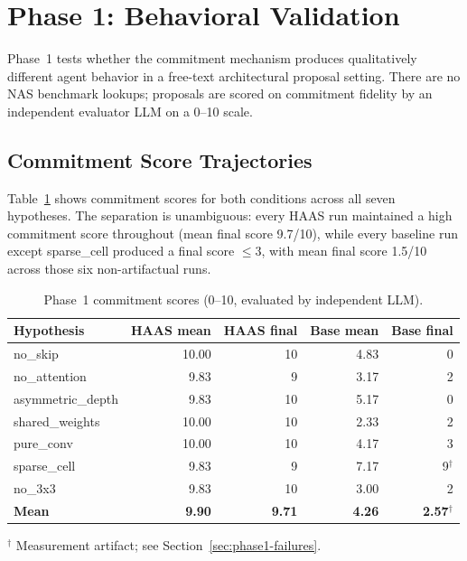 \documentclass[10pt]{article}
\newcommand{\haas}{\textsc{HAAS}}
\begin{document}
\section{Phase 1: Behavioral Validation}
\label{sec:phase1}

Phase~1 tests whether the commitment mechanism produces qualitatively different
agent behavior in a free-text architectural proposal setting. There are no NAS
benchmark lookups; proposals are scored on commitment fidelity by an independent
evaluator LLM on a 0--10 scale.

\subsection{Commitment Score Trajectories}
\label{sec:phase1-scores}

Table~\ref{tab:phase1} shows commitment scores for both conditions across all
seven hypotheses. The separation is unambiguous: every \haas{} run maintained a
high commitment score throughout (mean final score 9.7/10), while every baseline
run except sparse\_cell produced a final score $\leq 3$, with mean final score
1.5/10 across those six non-artifactual runs.

\begin{table}[t]
\caption{Phase~1 commitment scores (0--10, evaluated by independent LLM).}
\label{tab:phase1}
\begin{center}
\small
\begin{tabular}{lrrrr}
\toprule
\textbf{Hypothesis} & \textbf{HAAS mean} & \textbf{HAAS final} &
                      \textbf{Base mean} & \textbf{Base final} \\
\midrule
no\_skip          & 10.00 & 10 & 4.83 &  0 \\
no\_attention     &  9.83 &  9 & 3.17 &  2 \\
asymmetric\_depth &  9.83 & 10 & 5.17 &  0 \\
shared\_weights   & 10.00 & 10 & 2.33 &  2 \\
pure\_conv        & 10.00 & 10 & 4.17 &  3 \\
sparse\_cell      &  9.83 &  9 & 7.17 &  9$^\dagger$ \\
no\_3x3           &  9.83 & 10 & 3.00 &  2 \\
\midrule
\textbf{Mean}     &  \textbf{9.90} & \textbf{9.71} & \textbf{4.26} & \textbf{2.57}$^\dagger$ \\
\bottomrule
\end{tabular}
\end{center}
{\small $^\dagger$ Measurement artifact; see Section~\ref{sec:phase1-failures}.}
\end{table}
\end{document}
